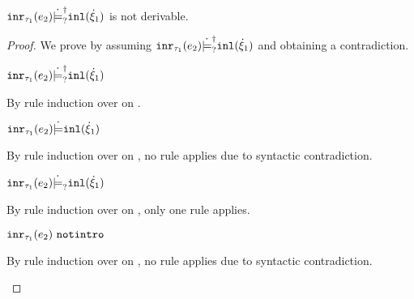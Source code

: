 \begin{lemma}
  \label{lem:inr-notsatormay-inl}
  $\mathtt{inr}_{\tau_1}({e_2}) \dot{\models}_{?}^{\dag} \mathtt{inl}(\dot{\xi}_1)$ is not derivable.
\end{lemma}
\begin{proof}
  We prove by assuming $\mathtt{inr}_{\tau_1}({e_2}) \dot{\models}_{?}^{\dag} \mathtt{inl}(\dot{\xi}_1)$ and obtaining a contradiction.
  \begin{pfsteps*}
  \item $\mathtt{inr}_{\tau_1}({e_2}) \dot{\models}_{?}^{\dag} \mathtt{inl}(\dot{\xi}_1)$  
  \end{pfsteps*}
  By rule induction over  on .
  \begin{byCases}
    \item[\text{(\ref{rule:CSMSSat})}]
    \begin{pfsteps*}
    \item $\mathtt{inr}_{\tau_1}({e_2}) \dot{\models} \mathtt{inl}(\dot{\xi}_1)$  
    \end{pfsteps*} 
    By rule induction over  on , no rule applies due to syntactic contradiction.
    \item[\text{(\ref{rule:CSMSMay})}] 
    \begin{pfsteps*}
    \item $\mathtt{inr}_{\tau_1}({e_2}) \dot{\models}_{?} \mathtt{inl}(\dot{\xi}_1)$  
    \end{pfsteps*} 
    By rule induction over  on , only one rule applies.
    \begin{byCases}
      \item[\text{(\ref{rule:CMSNotIntro})}]
      \begin{pfsteps*}
      \item $\mathtt{inr}_{\tau_1}({e_2}) ~\mathtt{notintro}$  
      \end{pfsteps*} 
      By rule induction over  on , no rule applies due to syntactic contradiction.
    \end{byCases}
  \end{byCases}
  \resetpfcounter
\end{proof}


